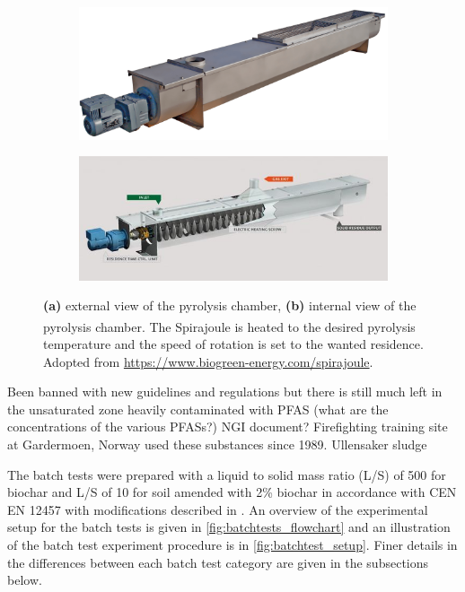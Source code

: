 \begin{figure}
    \centering
     \begin{subfigure}[t]{\linewidth}
         \centering
         \includegraphics[width=0.74\linewidth,scale=0.74]{Bilder/Pyrolysis/PyrolyzerChamber.png}
         \caption{}
     \end{subfigure}
    \centering
    \begin{subfigure}[b]{\linewidth}
         \centering
         \includegraphics[width=0.74\linewidth,scale=0.74]{Bilder/Pyrolysis/spirajoule.jpeg}
         \caption{}
     \end{subfigure}
    \caption{\textbf{(a)} external view of the pyrolysis chamber, \textbf{(b)} internal view of the pyrolysis chamber. The Spirajoule\textsuperscript{\textregistered} is heated to the desired pyrolysis temperature and the speed of rotation is set to the wanted residence. Adopted from \url{https://www.biogreen-energy.com/spirajoule}.}
    \label{fig:pyrolysischamber}
\end{figure}

Been banned with new guidelines and regulations but there is still much left in the unsaturated zone heavily contaminated with PFAS (what are the concentrations of the various PFASs?) NGI document? Firefighting training site at Gardermoen, Norway used these substances since 1989. Ullensaker sludge


The batch tests were prepared with a liquid to solid mass ratio (L/S) of 500 for biochar and L/S of 10 for soil amended with 2\% biochar in accordance with CEN EN 12457 with modifications described in \citep{Hale2017fire, kupryianchyk2016biochar}. An overview of the experimental setup for the batch tests is given in \cref{fig:batchtests_flowchart} and an illustration of the batch test experiment procedure is in \cref{fig:batchtest_setup}. Finer details in the differences between each batch test category are given in the subsections below. 


